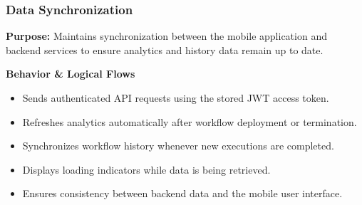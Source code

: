 
\subsubsection{Data Synchronization}

\textbf{Purpose:}
Maintains synchronization between the mobile application and backend services to ensure analytics and history data remain up to date.

\vspace{0.2cm}
\noindent\textbf{Behavior \& Logical Flows}

\begin{itemize}
    \item Sends authenticated API requests using the stored JWT access token.
    \item Refreshes analytics automatically after workflow deployment or termination.
    \item Synchronizes workflow history whenever new executions are completed.
    \item Displays loading indicators while data is being retrieved.
    \item Ensures consistency between backend data and the mobile user interface.
\end{itemize}
